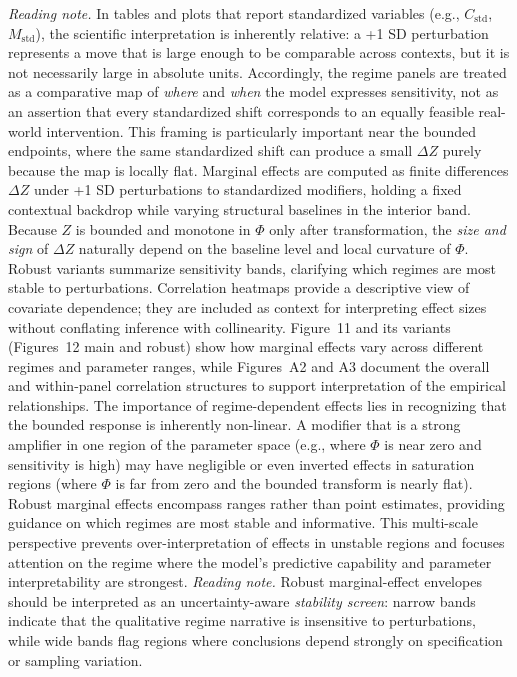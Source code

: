 \documentclass[11pt]{article}
\begin{document}
\noindent\justifying
\textit{Reading note.} In tables and plots that report standardized variables (e.g., $C_{\mathrm{std}}$, $M_{\mathrm{std}}$), the scientific interpretation is inherently relative: a +1 SD perturbation represents a move that is large enough to be comparable across contexts, but it is not necessarily large in absolute units.
Accordingly, the regime panels are treated as a comparative map of \emph{where} and \emph{when} the model expresses sensitivity, not as an assertion that every standardized shift corresponds to an equally feasible real-world intervention.
This framing is particularly important near the bounded endpoints, where the same standardized shift can produce a small $\Delta Z$ purely because the map is locally flat.
\noindent\justifying
Marginal effects are computed as finite differences $\Delta Z$ under +1 SD perturbations to standardized modifiers,
holding a fixed contextual backdrop while varying structural baselines in the interior band. Because $Z$ is bounded
and monotone in $\Phi$ only after transformation, the \emph{size and sign} of $\Delta Z$ naturally depend on the baseline
level and local curvature of $\Phi$. Robust variants summarize sensitivity bands, clarifying which regimes are most
stable to perturbations. Correlation heatmaps provide a descriptive view of covariate dependence; they are included as
context for interpreting effect sizes without conflating inference with collinearity. Figure~11 and its variants (Figures~12 main and robust) show how marginal effects vary across different regimes and parameter ranges, while Figures~A2 and A3 document the overall and within-panel correlation structures to support interpretation of the empirical relationships.
\noindent\justifying
The importance of regime-dependent effects lies in recognizing that the bounded response is inherently non-linear. A modifier that is a strong amplifier in one region of the parameter space (e.g., where $\Phi$ is near zero and sensitivity is high) may have negligible or even inverted effects in saturation regions (where $\Phi$ is far from zero and the bounded transform is nearly flat). Robust marginal effects encompass ranges rather than point estimates, providing guidance on which regimes are most stable and informative. This multi-scale perspective prevents over-interpretation of effects in unstable regions and focuses attention on the regime where the model's predictive capability and parameter interpretability are strongest.
\noindent\justifying
\textit{Reading note.} Robust marginal-effect envelopes should be interpreted as an uncertainty-aware \emph{stability screen}: narrow bands indicate that the qualitative regime narrative is insensitive to perturbations, while wide bands flag regions where conclusions depend strongly on specification or sampling variation.
\end{document}
